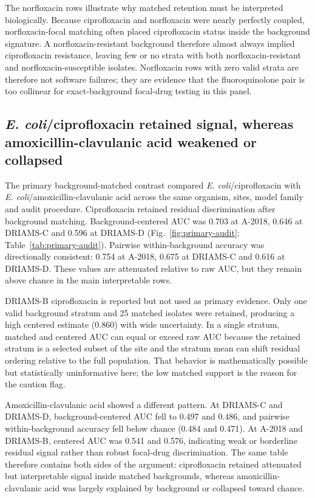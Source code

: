 \documentclass[11pt]{article}
\begin{document}


The norfloxacin rows illustrate why matched retention must be interpreted biologically. Because ciprofloxacin and norfloxacin were nearly perfectly coupled, norfloxacin-focal matching often placed ciprofloxacin status inside the background signature. A norfloxacin-resistant background therefore almost always implied ciprofloxacin resistance, leaving few or no strata with both norfloxacin-resistant and norfloxacin-susceptible isolates. Norfloxacin rows with zero valid strata are therefore not software failures; they are evidence that the fluoroquinolone pair is too collinear for exact-background focal-drug testing in this panel.

\subsection*{\textit{E. coli}/ciprofloxacin retained signal, whereas amoxicillin-clavulanic acid weakened or collapsed}

The primary background-matched contrast compared \textit{E. coli}/ciprofloxacin with \textit{E. coli}/amoxicillin-clavulanic acid across the same organism, sites, model family and audit procedure. Ciprofloxacin retained residual discrimination after background matching. Background-centered AUC was 0.703 at A-2018, 0.646 at DRIAMS-C and 0.596 at DRIAMS-D (Fig.~\ref{fig:primary-audit}; Table~\ref{tab:primary-audit}). Pairwise within-background accuracy was directionally consistent: 0.754 at A-2018, 0.675 at DRIAMS-C and 0.616 at DRIAMS-D. These values are attenuated relative to raw AUC, but they remain above chance in the main interpretable rows.

DRIAMS-B ciprofloxacin is reported but not used as primary evidence. Only one valid background stratum and 25 matched isolates were retained, producing a high centered estimate (0.860) with wide uncertainty. In a single stratum, matched and centered AUC can equal or exceed raw AUC because the retained stratum is a selected subset of the site and the stratum mean can shift residual ordering relative to the full population. That behavior is mathematically possible but statistically uninformative here; the low matched support is the reason for the caution flag.

Amoxicillin-clavulanic acid showed a different pattern. At DRIAMS-C and DRIAMS-D, background-centered AUC fell to 0.497 and 0.486, and pairwise within-background accuracy fell below chance (0.484 and 0.471). At A-2018 and DRIAMS-B, centered AUC was 0.541 and 0.576, indicating weak or borderline residual signal rather than robust focal-drug discrimination. The same table therefore contains both sides of the argument: ciprofloxacin retained attenuated but interpretable signal inside matched backgrounds, whereas amoxicillin-clavulanic acid was largely explained by background or collapsed toward chance.
\end{document}
